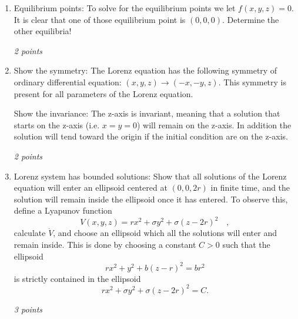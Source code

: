 \documentclass[a4paper,12pt]{article}
\begin{document}
 
 \begin{enumerate}


  \item 
  Equilibrium points:
To solve for the equilibrium points we let $ f (x,y,z) = 0 $. It is clear that one of those equilibrium point is $ (0,0,0) .$ Determine the other equilibria! 
  
   \textit{ 2 points} \\[2ex]

    \item 
    
  Show the  symmetry: 
The Lorenz equation has the following symmetry of ordinary differential equation: $ (x,y,z) \rightarrow (-x,-y,z) $. This symmetry is present for all parameters of the Lorenz equation.

Show the  invariance:
The z-axis is invariant, meaning that a solution that starts on the z-axis (i.e. $ x = y = 0 $) will remain on the z-axis. In addition the solution will tend toward the origin if the initial condition are on the z-axis.

 \textit{ 2 points} \\[2ex]


 \item
 Lorenz system has bounded solutions:
Show that all solutions of the Lorenz equation
will enter an ellipsoid centered at $(0,0,2r )$ in finite time, and the solution will remain inside the ellipsoid once it
has entered. To observe this, define a Lyapunov function
$$V(x,y,z)=r x^2 + \sigma y^2 + \sigma (z-2r )^2  \quad , $$ 
calculate $ \dot{V}  $, 
%
%
and choose an ellipsoid which all the solutions will enter and
remain inside. 
%
This is done by choosing a constant $C>0$ such that
the ellipsoid
$$r x^2 + y^2 + b (z -r)^2 = b r^2$$
is strictly contained in the ellipsoid
$$r x^2 + \sigma y^2 + \sigma (z-2r )^2=C.$$


 \textit{ 3 points} \\[2ex]



\end{enumerate}
\end{document}
